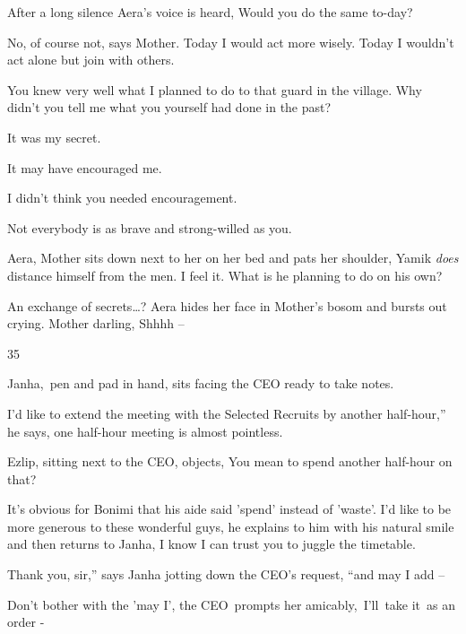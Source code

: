 \documentclass[twoside,11pt]{book}
\begin{document}
After a long silence Aera's voice is heard, {\textquotedbl}Would you do the same to-day?{\textquotedbl} 

{\textquotedbl}No, of course not,{\textquotedbl} says Mother. {\textquotedbl}Today I would act more wisely. Today I
wouldn't act alone but join with others.{\textquotedbl} 

{\textquotedbl}You knew very well what I planned to do to that guard in the village. Why didn't you tell me what you
yourself had done in the past?{\textquotedbl} 

{\textquotedbl}It was my secret.{\textquotedbl} 

{\textquotedbl}It may have encouraged me.{\textquotedbl} 

{\textquotedbl}I didn't think you needed encouragement.{\textquotedbl} \ 

{\textquotedbl}Not everybody is as brave and strong-willed as you.{\textquotedbl}

{\textquotedbl}Aera,{\textquotedbl} Mother sits down next to her on her bed and pats her shoulder, {\textquotedbl}Yamik
\textit{does} distance himself from the men. I feel it. What is he planning to do on his own?{\textquotedbl} 

{\textquotedbl}An exchange of secrets{\dots}?{\textquotedbl} Aera hides her face in Mother's bosom and bursts out
crying. {\textquotedbl}Mother darling, Shhhh --{\textquotedbl} 


\bigskip

35\ 

Janha,~pen and pad in hand, sits facing the CEO ready to take notes.\ 

{\textquotedbl}I'd like to extend the meeting with the Selected Recruits by another half-hour,'' he says,
{\textquotedbl}one half-hour meeting is almost pointless.{\textquotedbl}{\ }

Ezlip, sitting next to the CEO, objects, {\textquotedbl}You mean to spend another half{}-hour on that?{\textquotedbl}

It's obvious for Bonimi that his aide said 'spend' instead of {}'waste'. {\textquotedbl}I'd like to be more generous to
these wonderful guys,{\textquotedbl} he explains to him with his natural smile and then returns to Janha,
{\textquotedbl}I know I can trust you to juggle the timetable.{\textquotedbl}\ 

{\textquotedbl}Thank you, sir,'' says Janha jotting down the CEO's request, ``and may I add --{\textquotedbl} 

{\textquotedbl}Don't bother with the 'may I',{\textquotedbl} the CEO\ prompts her amicably,\ {\textquotedbl}I{}'ll\ take
it{\ }as an order -{\textquotedbl}\ 
\end{document}
